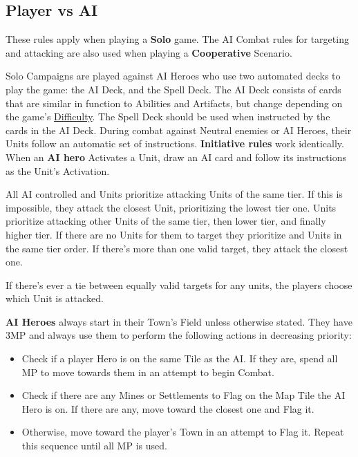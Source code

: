 \begin{multicols}{2}
\subsection*{\hypertarget{AIrules}{Player vs AI}}
These rules apply when playing a \textbf{Solo} game.
The AI Combat rules for targeting and attacking are also used when playing a \textbf{Cooperative} Scenario.\par
Solo Campaigns are played against AI Heroes who use two automated decks to play the game: the AI Deck, and the Spell Deck.
The AI Deck consists of cards that are similar in function to Abilities and Artifacts, but change depending on the game's \hyperlink{Difficulty}{Difficulty}.
The Spell Deck should be used when instructed by the cards in the AI Deck.
During combat against Neutral enemies or AI Heroes, their Units follow an automatic set of instructions.
\textbf{Initiative rules} work identically.
When an \textbf{AI hero} Activates a Unit, draw an AI card and follow its instructions as the Unit's Activation.\par
All AI controlled  and  Units prioritize attacking Units of the same tier.
If this is impossible, they attack the closest Unit, prioritizing the lowest tier one.
 Units prioritize attacking other  Units of the same tier, then lower tier, and finally higher tier.
If there are no  Units for them to target they prioritize  and  Units in the same tier order.
If there's more than one valid target, they attack the closest one.\par
If there's ever a tie between equally valid targets for any units, the players choose which Unit is attacked.

\textbf{AI Heroes} always start in their Town's Field unless otherwise stated.
They have 3MP and always use them to perform the following actions in decreasing priority:
\begin{itemize}
  \item Check if a player Hero is on the same Tile as the AI.
    If they are, spend all MP to move towards them in an attempt to begin Combat.
  \item Check if there are any Mines or Settlements to Flag on the Map Tile the AI Hero is on.
    If there are any, move toward the closest one and Flag it.
  \item Otherwise, move toward the player's Town in an attempt to Flag it.
Repeat this sequence until all MP is used.
\end{itemize}


\end{multicols}
